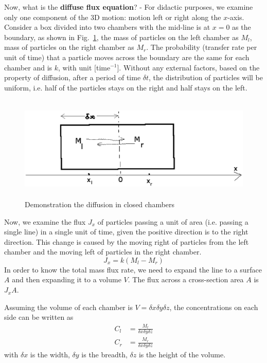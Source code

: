 Now, what is the {\bf diffuse flux equation}? - For didactic purposes,
we examine only one component of the 3D motion: motion left or right
along the $x$-axis. Consider a box divided into two chambers with the
mid-line is at $x=0$ as the boundary, as shown in
Fig.~\ref{fig:diffusion-chamber}, the mass of particles on the left
chamber as $M_l$, mass of particles on the right chamber as $M_r$.
The probability (transfer rate per unit of time) that a particle moves
across the boundary are the same for each chamber and is $k$, with
unit [time$^{-1}$].  Without any external factors, based on the
property of diffusion, after a period of time $\delta t$, the
distribution of particles will be uniform, i.e. half of the particles
stays on the right and half stays on the left.

\begin{figure}[hbt]
 \centerline{\includegraphics[height=5cm]{./images/diffusion_chamber.eps}}
 \caption{Demonstration the diffusion in closed chambers}
\label{fig:diffusion-chamber}
\end{figure}


Now, we examine the flux $J_x$ of particles passing a unit of area
(i.e. passing a single line) in a single unit of time, given the
positive direction is to the right direction. This change is caused by
the moving right of particles from the left chamber and the moving
left of particles in the right chamber.
\begin{equation}
  \label{eq:168}
  J_x = k(M_l-M_r)
\end{equation}
In order to know the total mass flux rate, we need to expand the line
to a surface $A$ and then expanding it to a volume $V$.  The flux
across a cross-section area $A$ is $J_xA$.


Assuming the volume of each chamber is $V=\delta x \delta y \delta z$,
the concentrations on each side can be written as
\begin{equation}
  \label{eq:169}
  \begin{split}
      C_l &= \frac{M_l}{\delta x \delta y \delta z} \\
      C_r &= \frac{M_r}{\delta x \delta y \delta z}
  \end{split}
\end{equation}
with $\delta x$ is the width, $\delta y$ is the breadth, $\delta z$ is
the height of the volume. 

